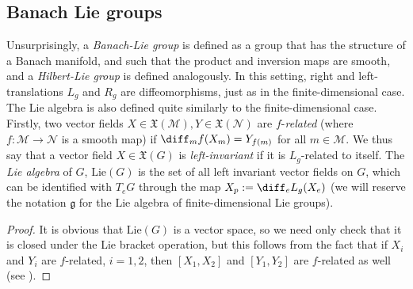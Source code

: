 \subsection{Banach Lie groups}
Unsurprisingly, a \textit{Banach-Lie group} is defined as a group that has the structure of a Banach manifold, and such that the product and inversion maps are smooth, and a \textit{Hilbert-Lie group} is defined analogously. In this setting, right and left-translations \(L_g\) and \(R_g\) are diffeomorphisms, just as in the finite-dimensional case. The Lie algebra is also defined quite similarly to the finite-dimensional case. Firstly, two vector fields \(X \in \mathfrak{X}(\mathcal{M}), Y \in \mathfrak{X}(\mathcal{N})\) are \(f\)-\textit{related} (where \(f\colon \mathcal{M}\to \mathcal{N}\) is a smooth map) if \(\diff_mf(X_m)=Y_{f(m)}\) for all \(m \in \mathcal{M} \). We thus say that a vector field \(X \in \mathfrak{X}(G)\) is \textit{left-invariant} if it is \(L_g\)-related to itself. The \textit{Lie algebra} of \(G\), \(\mathrm{Lie}(G)\) is the set of all left invariant vector fields on \(G\), which can be identified with \(T_eG\) through the map \(X_p:=\diff_e L_g(X_e)\) (we will reserve the notation \(\mathfrak{g}\) for the Lie algebra of finite-dimensional Lie groups).

 \begin{proof}
    It is obvious that \(\mathrm{Lie}(G)\) is a vector space, so we need only check that it is closed under the Lie bracket operation, but this follows from the fact that if \(X_i\) and \(Y_i\) are \(f\)-related, \(i=1,2\), then \([X_1, X_2]\) and \([Y_1, Y_2]\) are \(f\)-related as well (see \parencite[Page 117]{SergeLang}).
 \end{proof}


